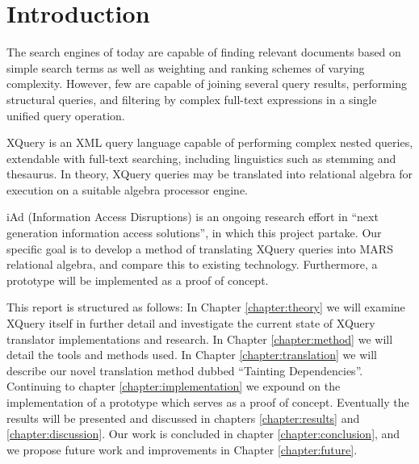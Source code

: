 \chapter{Introduction}
\label{chapter:introduction}
% 


The search engines of today are capable of finding relevant documents based
on simple search terms as well as weighting and ranking schemes of varying
complexity. However, few are capable of joining several query results,
performing structural queries, and filtering by complex full-text expressions
in a single unified query operation. 

XQuery is an XML query language capable of performing complex nested
queries, extendable with full-text searching, including linguistics such as
stemming and thesaurus. In theory, XQuery queries may be translated into
relational algebra for execution on a suitable algebra processor engine.

iAd \cite{iadcentre} (Information Access Disruptions) is an ongoing research
effort in ``next generation information access solutions'', in which this
project partake. Our specific goal is to develop a method of translating XQuery queries into MARS relational
algebra, and compare this to existing technology. Furthermore, a prototype will be
implemented as a proof of concept.

This report is structured as follows:
In Chapter \ref{chapter:theory} we will examine XQuery itself in further detail
and investigate the current state of XQuery translator implementations and
research. In Chapter \ref{chapter:method} we will detail the tools and methods
used. In Chapter \ref{chapter:translation} we will describe our novel
translation method dubbed ``Tainting Dependencies''. Continuing to chapter
\ref{chapter:implementation} we expound on the implementation of a prototype
which serves as a proof of concept. Eventually the results will be
presented and discussed in chapters \ref{chapter:results} and
\ref{chapter:discussion}. Our work is concluded in chapter
\ref{chapter:conclusion}, and we propose future work and improvements in
Chapter \ref{chapter:future}.
